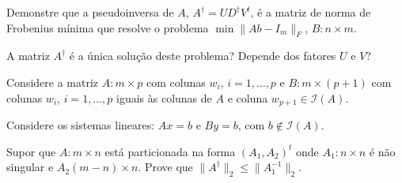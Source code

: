\documentclass[a4paper,12pt, leqno, answers]{exam}
\begin{document}
\begin{questions}
    \question Demonstre que a pseudoinversa de $A$, $A^\dagger = U D^\dagger V^t$, \'{e} a matriz de norma de Frobenius m\'{i}nima que resolve o problema $\min \| A b - I_m \|_F$, $B : n \times m$.

    A matriz $A^\dagger$ \'{e} a \'{u}nica solu\c{c}\~{a}o deste problema? Depende dos fatores $U$ e $V$?

    \begin{solution}
    \end{solution}

    \question Considere a matriz $A : m \times p$ com colunas $w_i$, $i = 1, \ldots, p$ e $B : m \times (p + 1)$ com colunas $w_i$, $i = 1, \ldots, p$ iguais \`{a}s colunas de $A$ e coluna $w_{p + 1} \in \mathcal{I}(A)$.

    Considere os sistemas lineares: $A x = b$ e $B y = b$, com $b \not\in \mathcal{I}(A)$.

    \question Supor que $A : m \times n$ est\'{a} particionada na forma $(A_1 , A_2)^t$ onde $A_1 : n \times n$ \'{e} n\~{a}o singular e $A_2 (m - n) \times n$. Prove que $\| A^\dagger \|_2 \leq \| A_1^{-1} \|_2$.
    \begin{solution}
    \end{solution}
\end{questions}
% 
% 
\end{document}
